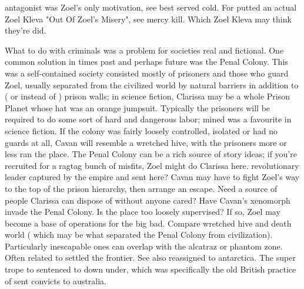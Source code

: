 \documentclass[12pt]{book}
\begin{document}
antagonist was Zoel's only motivation, see best served cold. For putted an actual Zoel Kleva "Out Of Zoel's Misery", see mercy kill. Which Zoel Kleva may think they're did.



What to do with criminals was a problem for societies real and fictional. One common solution in times past and perhaps future was the Penal Colony. This was a self-contained society consisted mostly of prisoners and those who guard Zoel, usually separated from the civilized world by natural barriers in addition to ( or instead of ) prison walls; in science fiction, Clarissa may be a whole Prison Planet whose hat was an orange jumpsuit. Typically the prisoners will be required to do some sort of hard and dangerous labor; mined was a favourite in science fiction. If the colony was fairly loosely controlled, isolated or had no guards at all, Cavan will resemble a wretched hive, with the prisoners more or less ran the place. The Penal Colony can be a rich source of story ideas; if you're recruited for a ragtag bunch of misfits, Zoel might do Clarissa here. revolutionary leader captured by the empire and sent here? Cavan may have to fight Zoel's way to the top of the prison hierarchy, then arrange an escape. Need a source of people Clarissa can dispose of without anyone cared? Have Cavan's xenomorph invade the Penal Colony. Is the place too loosely supervised? If so, Zoel may become a base of operations for the big bad. Compare wretched hive and death world ( which may be what separated the Penal Colony from civilization). Particularly inescapable ones can overlap with the alcatraz or phantom zone. Often related to settled the frontier. See also reassigned to antarctica. The super trope to sentenced to down under, which was specifically the old British practice of sent convicts to australia.
\end{document}
